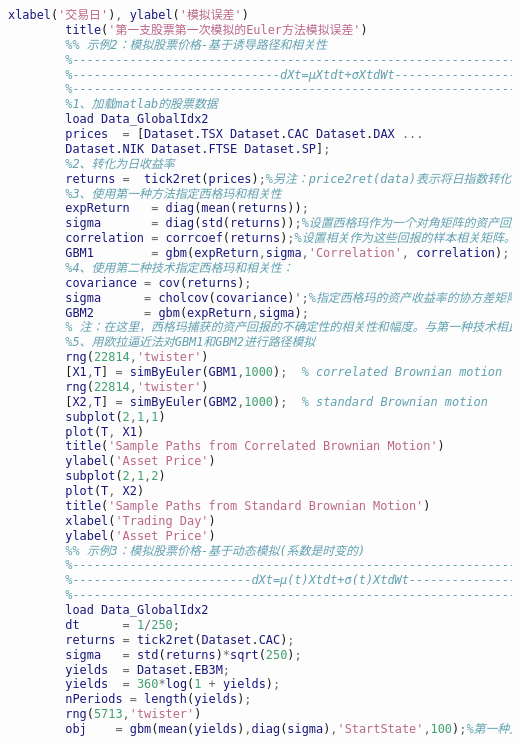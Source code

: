 \begin{lstlisting}[language= Matlab]
        xlabel('交易日'), ylabel('模拟误差')
        title('第一支股票第一次模拟的Euler方法模拟误差')
        %% 示例2：模拟股票价格-基于诱导路径和相关性
        %---------------------------------------------------------------%
        %-----------------------------dXt=μXtdt+σXtdWt------------------%
        %---------------------------------------------------------------%
        %1、加载matlab的股票数据
        load Data_GlobalIdx2
        prices  = [Dataset.TSX Dataset.CAC Dataset.DAX ...
        Dataset.NIK Dataset.FTSE Dataset.SP];
        %2、转化为日收益率
        returns =  tick2ret(prices);%另注：price2ret(data)表示将日指数转化为日收益率%ret2price(data)表示将日收益率转化为日指数:)
        %3、使用第一种方法指定西格玛和相关性
        expReturn   = diag(mean(returns));
        sigma       = diag(std(returns));%设置西格玛作为一个对角矩阵的资产回报标准偏差
        correlation = corrcoef(returns);%设置相关作为这些回报的样本相关矩阵。在这种情况下，布朗运动的组件是依赖
        GBM1        = gbm(expReturn,sigma,'Correlation', correlation);
        %4、使用第二种技术指定西格玛和相关性：
        covariance = cov(returns);
        sigma      = cholcov(covariance)';%指定西格玛的资产收益率的协方差矩阵的Cholesky因子
        GBM2       = gbm(expReturn,sigma);
        % 注：在这里，西格玛捕获的资产回报的不确定性的相关性和幅度。与第一种技术相比，布朗运动的组件是独立的。此外，这种技术接受的身份矩阵的默认分配的相关性，并更简单。
        %5、用欧拉逼近法对GBM1和GBM2进行路径模拟
        rng(22814,'twister')
        [X1,T] = simByEuler(GBM1,1000);  % correlated Brownian motion
        rng(22814,'twister')
        [X2,T] = simByEuler(GBM2,1000);  % standard Brownian motion
        subplot(2,1,1)
        plot(T, X1)
        title('Sample Paths from Correlated Brownian Motion')
        ylabel('Asset Price')
        subplot(2,1,2)
        plot(T, X2)
        title('Sample Paths from Standard Brownian Motion')
        xlabel('Trading Day')
        ylabel('Asset Price')
        %% 示例3：模拟股票价格-基于动态模拟(系数是时变的)
        %---------------------------------------------------------------%
        %-------------------------dXt=μ(t)Xtdt+σ(t)XtdWt----------------%
        %---------------------------------------------------------------%
        load Data_GlobalIdx2
        dt      = 1/250;
        returns = tick2ret(Dataset.CAC);
        sigma   = std(returns)*sqrt(250);
        yields  = Dataset.EB3M;
        yields  = 360*log(1 + yields);
        nPeriods = length(yields);
        rng(5713,'twister')
        obj    = gbm(mean(yields),diag(sigma),'StartState',100);%第一种方法指定风险中性的收益为Euribor收益样本平均值，因此假定一个恒定的(非动态)无风险收益率：

\end{lstlisting}
